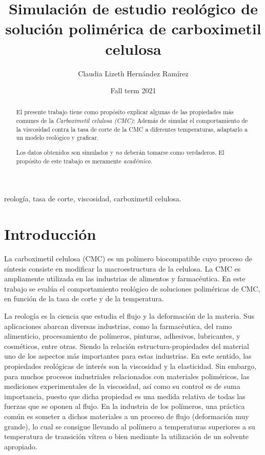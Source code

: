 \documentclass{elsarticle}
\title{Simulaci\'on de estudio reol\'ogico de soluci\'on polim\'erica de carboximetil celulosa\tnoteref{t1}}
\author[1]{ Claudia Lizeth Hern\'andez Ram\'irez}
\date{Fall term 2021}
\begin{document}
\begin{abstract}

El presente trabajo tiene como prop\'osito explicar algunas de las propiedades m\'as comunes de la \textit{Carboximetil celulosa (CMC)}; Adem\'as de simular el comportamiento de la viscosidad contra la tasa de corte de la CMC a diferentes temperaturas, adaptarlo a un modelo reol\'ogico y graficar.

Los datos obtenidos son simulados y \textit{no} deber\'an tomarse como verdaderos.
El prop\'osito de este trabajo es meramente \textit{acad\'emico}.
\end{abstract}

\begin{keyword}
reolog\'ia, tasa de corte, viscosidad, carboximetil celulosa.
\end{keyword}

\maketitle
\section{Introducci\'on}
La carboximetil celulosa (CMC) es un pol\'imero biocompatible cuyo proceso de s\'intesis consiste en modificar la macroestructura de la celulosa. La CMC es ampliamente utilizada en las industrias de alimentos y farmac\'eutica. En este trabajo se eval\'ua el comportamiento reol\'ogico de soluciones polim\'ericas de CMC, en funci\'on de la tasa de corte y de la temperatura. 

La reolog\'ia es la ciencia que estudia el flujo y la deformaci\'on de la materia. Sus aplicaciones abarcan diversas industrias, como la farmac\'eutica, del ramo alimenticio, procesamiento de pol\'imeros, pinturas, adhesivos, lubricantes, y cosm\'eticos, entre otras\cite{R1,R2,R3, R4}. Siendo la relaci\'on estructura-propiedades del material uno de los aspectos m\'as importantes para estas industrias. En este sentido, las propiedades reol\'ogicas de inter\'es son la viscosidad y la elasticidad. Sin embargo, para muchos procesos industriales relacionados con materiales polim\'ericos, las mediciones experimentales de la viscosidad, así como su control es de suma importancia, puesto que dicha propiedad es una medida relativa de todas las fuerzas que se oponen al flujo. En la industria de los pol\'imeros, una pr\'actica común es someter a dichos materiales a un proceso de flujo (deformación muy grande), lo cual se consigue llevando al pol\'imero a temperaturas superiores a su temperatura de transici\'on v\'itrea o bien mediante la utilizaci\'on de un solvente apropiado. 
\end{document}
